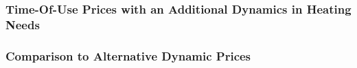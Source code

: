 \subsubsection{Time-Of-Use Prices with an Additional Dynamics in Heating Needs}
\label{Sub-subsection:Time-Of-Use-Prices-with-an-Additional-Dynamics-in-Heating-Needs}



\subsubsection{Comparison to Alternative Dynamic Prices}
\label{Sub-subsection:Comparison-to-Alternative-Dynamic-Prices}

